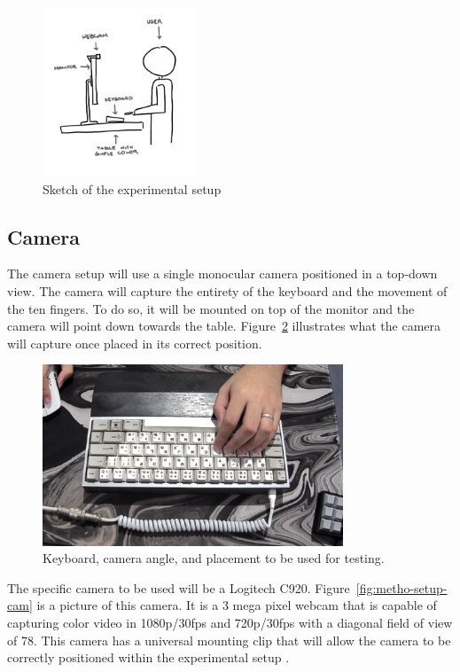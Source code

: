 \documentclass{report}
\begin{document}
\begin{figure}[H]
	\centering
	\includegraphics[width=0.4\textwidth]{setup.png}
	\caption{Sketch of the experimental setup}
	\label{fig:metho-setup}
	\centering
\end{figure}

\subsection{Camera}
The camera setup will use a single monocular camera positioned in a top-down
view. The camera will capture the entirety of the keyboard and the movement of
the ten fingers. To do so, it will be mounted on top of the monitor and the
camera will point down towards the table. Figure~\ref{fig:metho-setup-keeb}
illustrates what the camera will capture once placed in its correct position.

\begin{figure}[H]
	\centering
	\includegraphics[width=0.8\textwidth]{actual-keeb.png}
	\caption{Keyboard, camera angle, and placement to be used for testing.}
	\label{fig:metho-setup-keeb}
\end{figure}

The specific camera to be used will be a Logitech C920.
Figure~\ref{fig:metho-setup-cam} is a picture of this camera. It is a 3 mega pixel
webcam that is capable of capturing color video in 1080p/30fps and 720p/30fps
with a diagonal field of view of 78\degree. This camera has a universal mounting
clip that will allow the camera to be correctly positioned within the
experimental setup \parencite{logitech}.
\end{document}
